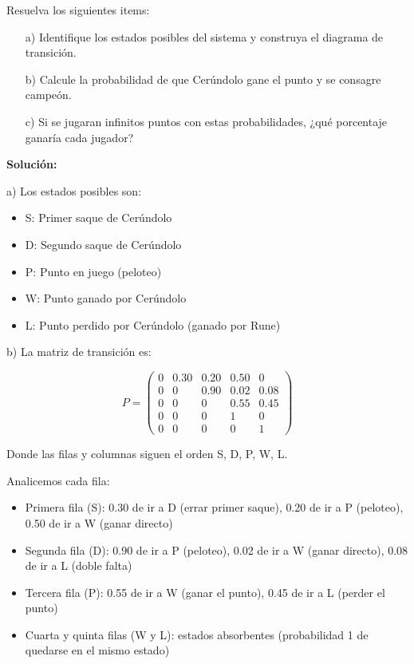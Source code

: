\documentclass[a4paper,11pt]{article}
\begin{document}
Resuelva los siguientes items:

\begin{itemize}
    \item[a)] Identifique los estados posibles del sistema y construya el diagrama de transición.
    \item[b)] Calcule la probabilidad de que Cerúndolo gane el punto y se consagre campeón.
    \item[c)] Si se jugaran infinitos puntos con estas probabilidades, ¿qué porcentaje ganaría cada jugador?
\end{itemize}

\textbf{Solución:}

\vspace{0.5em}

a) Los estados posibles son:
\begin{itemize}
    \item S: Primer saque de Cerúndolo
    \item D: Segundo saque de Cerúndolo
    \item P: Punto en juego (peloteo)
    \item W: Punto ganado por Cerúndolo
    \item L: Punto perdido por Cerúndolo (ganado por Rune)
\end{itemize}

\vspace{0.5em}

b) La matriz de transición es:

\[P = \begin{pmatrix}
0 & 0.30 & 0.20 & 0.50 & 0 \\
0 & 0 & 0.90 & 0.02 & 0.08 \\
0 & 0 & 0 & 0.55 & 0.45 \\
0 & 0 & 0 & 1 & 0 \\
0 & 0 & 0 & 0 & 1
\end{pmatrix}\]

\begin{center}
Donde las filas y columnas siguen el orden S, D, P, W, L.
\end{center}

\vspace{0.5em}
Analicemos cada fila:
\begin{itemize}
    \item Primera fila (S): 0.30 de ir a D (errar primer saque), 0.20 de ir a P (peloteo), 0.50 de ir a W (ganar directo)
    \item Segunda fila (D): 0.90 de ir a P (peloteo), 0.02 de ir a W (ganar directo), 0.08 de ir a L (doble falta)
    \item Tercera fila (P): 0.55 de ir a W (ganar el punto), 0.45 de ir a L (perder el punto)
    \item Cuarta y quinta filas (W y L): estados absorbentes (probabilidad 1 de quedarse en el mismo estado)
\end{itemize}
\end{document}
